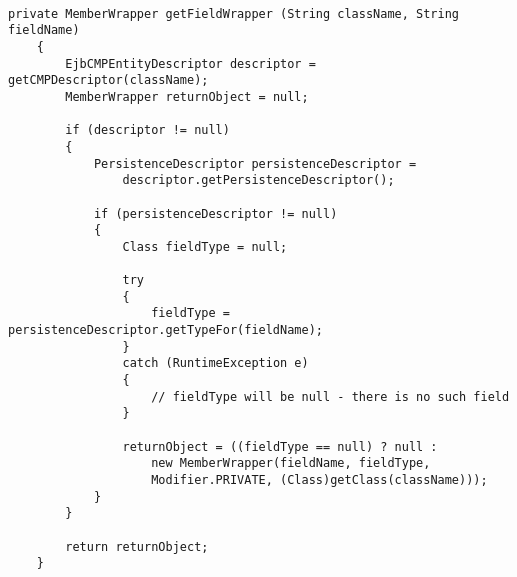 \begin{lstlisting}

private MemberWrapper getFieldWrapper (String className, String fieldName)
	{
		EjbCMPEntityDescriptor descriptor = getCMPDescriptor(className);
		MemberWrapper returnObject = null;

		if (descriptor != null)
		{
			PersistenceDescriptor persistenceDescriptor =
				descriptor.getPersistenceDescriptor();

			if (persistenceDescriptor != null)
			{
				Class fieldType = null;

				try
				{
					fieldType = persistenceDescriptor.getTypeFor(fieldName);
				}
				catch (RuntimeException e)
				{
					// fieldType will be null - there is no such field
				}

				returnObject = ((fieldType == null) ? null :
					new MemberWrapper(fieldName, fieldType, 
					Modifier.PRIVATE, (Class)getClass(className)));
			}
		}

		return returnObject;
	}

\end{lstlisting}